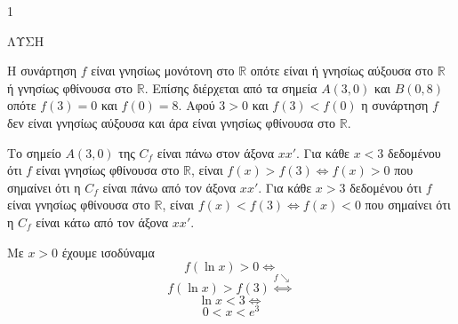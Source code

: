 \begin{ylh}{1}
    \item [Ύλη από εικόνα]
\end{ylh}
ΛΥΣΗ
\begin{alist}
    \item Η συνάρτηση $f$ είναι γνησίως μονότονη στο $\mathbb{R}$ οπότε είναι ή γνησίως αύξουσα στο $\mathbb{R}$ ή γνησίως φθίνουσα στο $\mathbb{R}$.
    Επίσης διέρχεται από τα σημεία $A(3,0)$ και $B(0,8)$ οπότε $f(3)=0$ και $f(0)=8$.
    Αφού $3>0$ και $f(3)<f(0)$ η συνάρτηση $f$ δεν είναι γνησίως αύξουσα και άρα είναι γνησίως φθίνουσα στο $\mathbb{R}$.

    \item Το σημείο $A(3,0)$ της $C_f$ είναι πάνω στον άξονα $xx'$.
    Για κάθε $x<3$ δεδομένου ότι $f$ είναι γνησίως φθίνουσα στο $\mathbb{R}$, είναι $f(x)>f(3) \Leftrightarrow f(x)>0$ που σημαίνει ότι η $C_f$ είναι πάνω από τον άξονα $xx'$.
    Για κάθε $x>3$ δεδομένου ότι $f$ είναι γνησίως φθίνουσα στο $\mathbb{R}$, είναι $f(x)<f(3) \Leftrightarrow f(x)<0$ που σημαίνει ότι η $C_f$ είναι κάτω από τον άξονα $xx'$.

    \item Με $x>0$ έχουμε ισοδύναμα
    \[ f(\ln x)>0 \Leftrightarrow \]
    \[ f(\ln x)>f(3) \overset{f\searrow}{\Leftrightarrow} \]
    \[ \ln x<3 \Leftrightarrow \]
    \[ 0<x<e^3 \]
\end{alist}